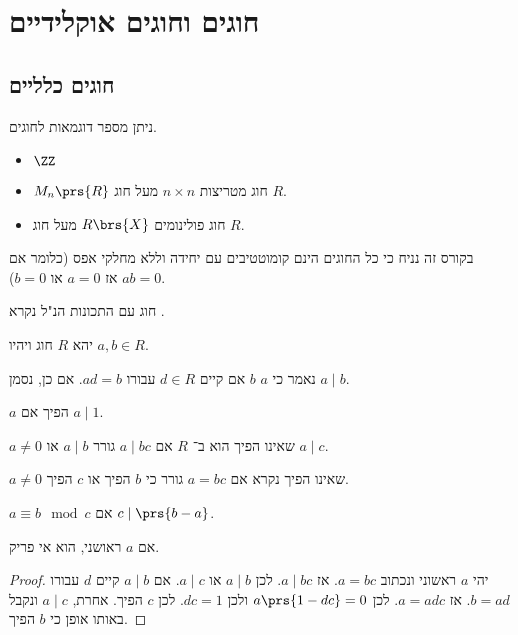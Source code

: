 \documentclass[a4paper,10pt,twoside,openany]{book}
\begin{document}
\section{חוגים וחוגים אוקלידיים}

\subsection{חוגים כלליים}

ניתן מספר דוגמאות לחוגים.

\begin{examples}
\begin{itemize}
\item $\ZZ$
\item $M_n\prs{R}$
חוג מטריצות
$n \times n$
מעל חוג
$R$.
\item חוג פולינומים
$R\brs{X}$
מעל חוג
$R$.
\end{itemize}
\end{examples}
בקורס זה נניח כי כל החוגים הינם קומוטטיבים עם יחידה וללא מחלקי אפס (כלומר אם $ab = 0$ אז $a=0$ או $b=0$).

\begin{definition}
חוג עם התכונות הנ"ל נקרא
.
\end{definition}
יהא
$R$
חוג ויהיו
$a,b \in R$.

\begin{definition}
נאמר כי
$a$
$b$
אם קיים
$d \in R$
עבורו
$ad = b$.
אם כן, נסמן
$a \mid b$.
\end{definition}
\begin{definition}
$a$
הפיך אם
$a \mid 1$.
\end{definition}
\begin{definition}
$a\neq 0$
שאינו הפיך הוא
ב־%
$R$
אם
$a \mid bc$
גורר
$a \mid b$
או
$a \mid c$.
\end{definition}
\begin{definition}
$a\neq 0$
שאינו הפיך נקרא
אם
$a=bc$
גורר כי
$b$
הפיך או
$c$
הפיך.
\end{definition}

\begin{definition}
$a \equiv b \mod{c}$
אם
$c \mid \prs{b-a}$.
\end{definition}
\begin{claim}
אם
$a$
ראושני, הוא אי פריק.
\end{claim}
\begin{proof}
יהי
$a$
ראשוני ונכתוב
$a=bc$.
אז
$a \mid bc$.
לכן
$a \mid b$
או
$a \mid c$.
אם
$a \mid b$
קיים
$d$
עבורו
$b = ad$.
אז
$a = adc$.
לכן
$a\prs{1-dc} = 0$
ולכן
$dc = 1$.
לכן $c$ הפיך.
אחרת,
$a \mid c$
ונקבל באותו אופן כי
$b$
הפיך.
\end{proof}
\end{document}
